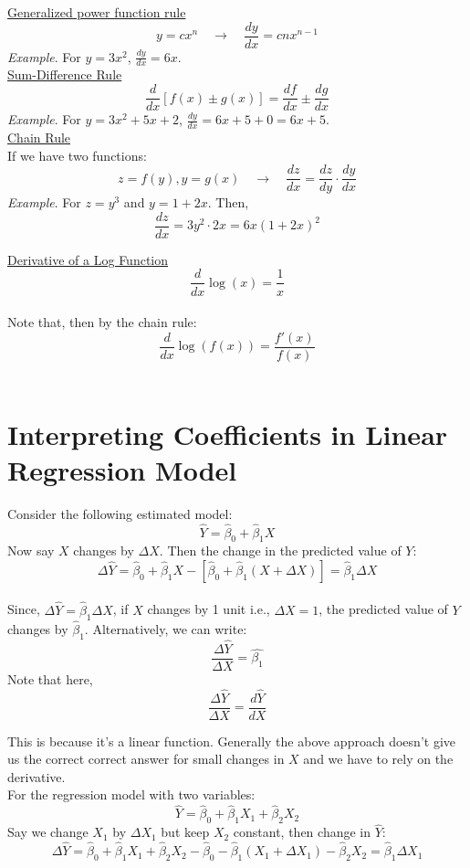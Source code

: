 \documentclass{./../../Latex/handout}
\begin{document}
\underline{Generalized power function rule}
$$ y=cx^{n} \quad \rightarrow \quad \frac{d y}{d x}=cn x^{n-1} $$
\textit{\textit{Example}}. For $y=3 x^{2}$, $ \frac{d y}{d x}=6 x $.\\

\underline{Sum-Difference Rule} 
$$ \frac{d}{d x}[f(x) \pm g(x)]=\frac{d f}{d x} \pm \frac{d g}{d x} $$ 
\textit{Example}. For $y=3 x^{2}+5x+2$, $ \frac{d y}{d x}=6 x+5+0 =6x+5$. \\

\underline{Chain Rule}  \\
If we have two functions:
$$ z=f(y),  y=g(x) \quad \rightarrow  \quad  \frac{d z}{d x}=\frac{d z}{d y} \cdot \frac{d y}{d x}$$ 
\textit{Example}. For $z = y^3$ and $y=1+2x$. Then, $$ \frac{d z}{d x}=3y^2 \cdot 2x = 6x (1+2x)^2$$ 

\newpage
\underline{Derivative of a Log Function} 
$$ \frac{d}{d x} \log(x) =\frac{1}{x} $$ \\
Note that, then by the chain rule:
 $$ \frac{d}{d x} \log(f(x)) =\frac{f'(x)}{f(x)} $$ \\
 
\section{Interpreting Coefficients in Linear Regression Model}

Consider the following estimated model:
$$ \hat{Y} = \hat{\beta}_0 + \hat{\beta}_1 X  $$
Now say $X$ changes by $\Delta X$. Then the change in the predicted value of $Y$:
$$ \Delta \hat{Y} = \hat{\beta}_0 + \hat{\beta}_1 X- [\hat{\beta}_0 + \hat{\beta}_1 (X+\Delta X)] = \hat{\beta}_1 \Delta X  $$ \\
Since, $ \Delta \hat{Y} =  \hat{\beta}_1 \Delta X $, if $X$ changes by 1 unit i.e., $\Delta X=1$, the predicted value of $Y$ changes by $\hat{\beta}_1$. Alternatively, we can write:
$$ \frac{\Delta \hat{Y}}{\Delta X} = \hat{\beta_1}  $$
Note that here, $$\frac{\Delta \hat{Y}}{\Delta X} = \frac{d \hat{Y}}{d X}$$

This is because it's a linear function. Generally the above approach doesn't give us the correct correct answer for small changes in $X$ and we have to rely on the derivative. \\

For the regression model with two variables:
$$ \hat{Y} = \hat{\beta}_0 + \hat{\beta}_1 X_1 + \hat{\beta}_2 X_2    $$
Say we change $X_1$ by $\Delta X_1$ but keep $X_2$ constant, then change in $\hat{Y}$:
$$ \Delta \hat{Y} = \hat{\beta}_0 + \hat{\beta}_1 X_1 + \hat{\beta}_2 X_2-\hat{\beta}_0 - \hat{\beta}_1 (X_1+\Delta X_1) - \hat{\beta}_2 X_2 = \hat{\beta}_1 \Delta X_1    $$
\end{document}
